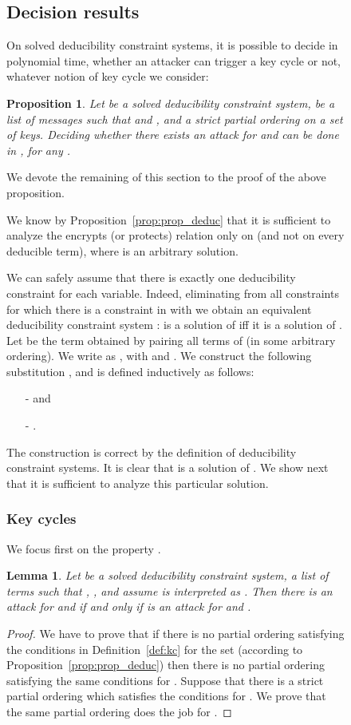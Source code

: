 \documentclass[acmtocl,acmnow]{acmtrans2m}
\newtheorem{proposition}[theorem]{Proposition}
\newtheorem{lemma}[theorem]{Lemma}
\newcommand{\dedcons}[1]{deducibility constraint}
\newcommand{\dedsys}[1]{deducibility constraint system}
\newcommand{\dedsyss}[1]{deducibility constraint systems}
\begin{document}
\begin{figure}[t]
{{\subsection{Decision results}

On solved \dedsyss{}, it is possible to decide in polynomial time,
whether an attacker can trigger a key cycle or not, whatever notion of
key cycle we consider: 

\begin{proposition}\label{lemma_deter_ext}
Let   be a solved \dedsys{},  be a list of messages such that
 and , and  a strict partial ordering on a
set of keys. Deciding whether there exists an attack for  and   can be done in , for any .
\end{proposition}





We devote the remaining of this section to the proof of the above proposition.

We know by Proposition~\ref{prop:prop_deduc} that it is sufficient to analyze the encrypts (or protects)
relation only on  (and not on every deducible term), where  is an arbitrary
 solution.

We can safely assume that there is exactly one \dedcons{} for each variable. 
Indeed, eliminating from  all constraints  
for which there is a constraint  in  with  
we obtain an equivalent \dedsys{}  :  is a solution of  iff it is a solution of .
Let  be the term obtained by pairing all terms of  (in some arbitrary ordering).
We write  as , with  and .
We construct the following substitution ,
and  is defined inductively as follows:
\begin{itemize}
\item[-]  and 
\item[-] .
\end{itemize}
The construction is correct by the definition of \dedsyss{}.
It is clear that  is a  solution of . We show next that it is sufficient to analyze this
particular solution. 




\subsubsection{Key cycles} 
We focus first on the property .






\begin{lemma}\label{lem:tau_sol_kc}
Let  be a solved \dedsys{},  a list of terms such that ,
, and assume  is interpreted as . Then
there is an attack for  and  if and only if  is an attack
for  and .
\end{lemma}
\begin{proof}
We have to prove that if there is no partial ordering satisfying the conditions in Definition~\ref{def:kc} for
the set  (according to Proposition~\ref{prop:prop_deduc}) then there is no partial ordering
satisfying the same conditions for . Suppose that there is a strict partial ordering  which
satisfies the conditions for . We prove that the same partial ordering does the job for
.



\end{proof}}}
\end{figure}
\end{document}
